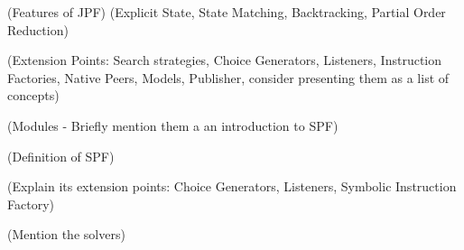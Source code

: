 (Features of JPF) (Explicit State, State Matching, Backtracking, Partial Order Reduction)

(Extension Points: Search strategies, Choice Generators, Listeners, Instruction Factories, Native Peers, Models, Publisher, consider presenting them as a list of concepts)

(Modules - Briefly mention them a an introduction to SPF)

\label{subsec:spf}

(Definition of SPF)

(Explain its extension points: Choice Generators, Listeners, Symbolic Instruction Factory)

(Mention the solvers)







